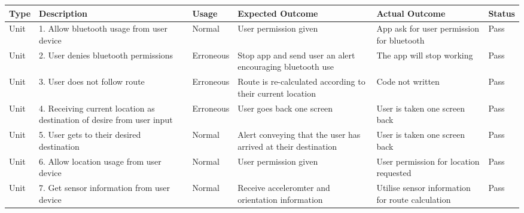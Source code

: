 \begin{sidewaystable}
\begin{longtable}{|p{2cm}|p{5cm}|l|p{5cm}|p{5cm}|l|}
\toprule
\textbf{Type} & \textbf{Description}                                                   & \textbf{Usage} & \textbf{Expected Outcome}                                               & \textbf{Actual Outcome}                                                   & \textbf{Status} \\ \midrule
Unit          & 1. Allow bluetooth usage from user device                              & Normal         & User permission given                                                   & App ask for user permission for bluetooth                                 & Pass            \\ \hline
Unit          & 2. User denies bluetooth permissions                                   & Erroneous      & Stop app and send user an alert encouraging bluetooth use               & The app will stop working                                                 & Pass            \\ \hline
Unit          & 3. User does not follow route                                          & Erroneous      & Route is re-calculated according to their current location              & Code not written                                                          & Pass            \\ \hline
Unit          & 4. Receiving current location as destination of desire from user input & Erroneous      & User goes back one screen                                               & User is taken one screen back                                             & Pass            \\ \hline
Unit          & 5. User gets to their desired destination                              & Normal         & Alert conveying that the user has arrived at their destination          & User is taken one screen back                                             & Pass            \\ \hline
Unit          & 6. Allow location usage from user device                               & Normal         & User permission given                                                   & User permission for location requested                                    & Pass            \\ \hline
Unit          & 7. Get sensor information from user device                             & Normal         & Receive acceleromter and orientation information                        & Utilise sensor information for route calculation                          & Pass            \\ \hline

\end{longtable}
\end{sidewaystable}
